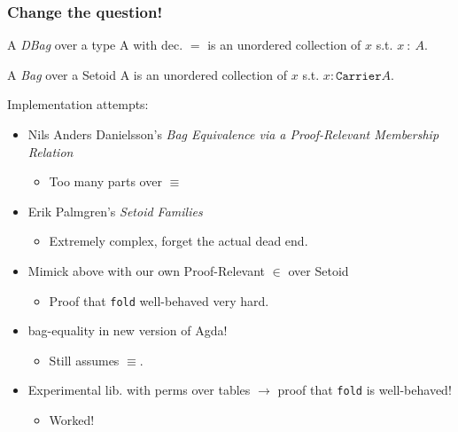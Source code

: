 \documentclass[serif,mathserif,professionalfont,10pt]{beamer}
\begin{document}
\begin{frame}
\frametitle{Change the question!}
\begin{definition}
A \emph{DBag} over a type A with dec. $=$ is an unordered
collection of $x$ s.t. $x~:~A$.
\end{definition}
\pause
\begin{definition}
A \emph{Bag} over a Setoid A is an unordered
collection of $x$ s.t. $x : \texttt{Carrier} A$.
\end{definition}
\pause
Implementation attempts:
\begin{itemize}
\item<4->Nils Anders Danielsson's
\textit{Bag Equivalence via a Proof-Relevant Membership Relation}
\begin{itemize}
\item<5->Too many parts over $\equiv$
\end{itemize}
\item<6->Erik Palmgren's \textit{Setoid Families}
\begin{itemize}
\item<7->Extremely complex, forget the actual dead end.
\end{itemize}
\item<8->Mimick above with our own Proof-Relevant $\in$ over
  Setoid
\begin{itemize}
\item<9->Proof that \texttt{fold} well-behaved very hard.
\end{itemize}
\item<10->bag-equality in new version of Agda!
\begin{itemize}
\item<11->Still assumes $\equiv$.
\end{itemize}
\item<12->Experimental lib. with perms over tables
$\rightarrow$ proof that \texttt{fold} is well-behaved!
\begin{itemize}
\item<13->Worked!
\end{itemize}
\end{itemize}
\end{frame}
\end{document}

